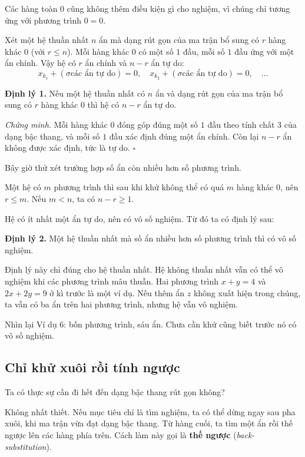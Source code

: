 \documentclass[12pt,a4paper]{article}
\begin{document}
Các hàng toàn \(0\) cũng không thêm điều kiện gì cho nghiệm, vì chúng chỉ tương ứng với phương trình \(0=0\).

Xét một hệ thuần nhất \(n\) ẩn mà dạng rút gọn của ma trận bổ sung có \(r\) hàng khác \(0\) (với \(r\le n\)). Mỗi hàng khác \(0\) có một số \(1\) đầu, mỗi số \(1\) đầu ứng với một ẩn chính. Vậy hệ có \(r\) ẩn chính và \(n-r\) ẩn tự do:
$$
x_{k_1}+(\sigma \text{các ẩn tự do})=0,\quad x_{k_2}+(\sigma \text{các ẩn tự do})=0,\quad\ldots \tag{4}
$$

\textbf{Định lý 1.} Nếu một hệ thuần nhất có \(n\) ẩn và dạng rút gọn của ma trận bổ sung có \(r\) hàng khác \(0\) thì hệ có \(n-r\) ẩn tự do.

\emph{Chứng minh.} Mỗi hàng khác \(0\) đóng góp đúng một số \(1\) đầu theo tính chất 3 của dạng bậc thang, và mỗi số \(1\) đầu xác định đúng một ẩn chính. Còn lại \(n-r\) ẩn không được xác định, tức là tự do. \(\square\)

Bây giờ thử xét trường hợp số ẩn còn nhiều hơn số phương trình.

Một hệ có \(m\) phương trình thì sau khi khử không thể có quá \(m\) hàng khác \(0\), nên \(r\le m\). Nếu \(m<n\), ta có \(n-r\ge 1\).

Hệ có ít nhất một ẩn tự do, nên có vô số nghiệm. Từ đó ta có định lý sau:

\textbf{Định lý 2.} Một hệ thuần nhất mà số ẩn nhiều hơn số phương trình thì có vô số nghiệm.

Định lý này chỉ đúng cho hệ thuần nhất. Hệ không thuần nhất vẫn có thể vô nghiệm khi các phương trình mâu thuẫn. Hai phương trình \(x+y=4\) và \(2x+2y=9\) ở kì trước là một ví dụ. Nếu thêm ẩn \(z\) không xuất hiện trong chúng, ta vẫn có ba ẩn trên hai phương trình, nhưng hệ vẫn vô nghiệm.

Nhìn lại Ví dụ 6: bốn phương trình, sáu ẩn. Chưa cần khử cũng biết trước nó có vô số nghiệm.

\subsection{Chỉ khử xuôi rồi tính ngược}

Ta có thực sự cần đi hết đến dạng bậc thang rút gọn không?

Không nhất thiết. Nếu mục tiêu chỉ là tìm nghiệm, ta có thể dừng ngay sau pha xuôi, khi ma trận vừa đạt dạng bậc thang. Từ hàng cuối, ta tìm một ẩn rồi thế ngược lên các hàng phía trên. Cách làm này gọi là \textbf{thế ngược} (\emph{back-substitution}).
\end{document}
